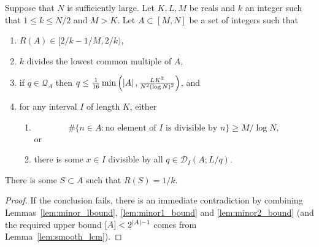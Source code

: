 \begin{proposition}\label{prop:fourier}
  \leanok
Suppose that $N$ is sufficiently large. Let $K,L,M$ be reals and $k$ an integer such that $1\leq k\leq N/2$ and $M>K$. Let $A\subset [M,N]$ be a set of integers such that
\begin{enumerate}
\item $R(A)\in [2/k-1/M,2/k)$,
\item $k$ divides the lowest common multiple of $A$,
\item if $q\in\mathcal{Q}_A$ then $q\leq \tfrac{1}{16}\min\left( \left\lvert A\right\rvert,\frac{LK^2}{N^2(\log N)^2}\right)$,  and
\item for any interval $I$ of length $K$, either
\begin{enumerate}
\item \[\# \{ n\in A : \textrm{no element of }I\textrm{ is divisible by }n\}\geq M/\log N,\]
or
\item there is some $x\in I$ divisible by all $q\in\mathcal{D}_I(A; L/q)$.
\end{enumerate}
\end{enumerate}
There is some $S\subset A$ such that $R(S)=1/k$.
\end{proposition}
\begin{proof}
If the conclusion fails, there is an immediate contradiction by combining Lemmas~\ref{lem:minor_lbound}, \ref{lem:minor1_bound} and \ref{lem:minor2_bound} (and the required upper bound $[A]<2^{\left\lvert A\right\rvert-1}$ comes from Lemma~\ref{lem:smooth_lcm}).
\end{proof}
